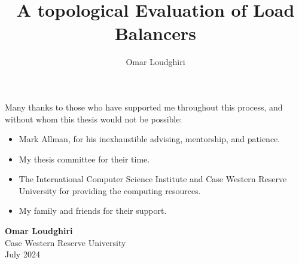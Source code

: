 \documentclass[12pt]{cwru_thesis}
\begin{document}


\title{A topological Evaluation of Load Balancers} %
\author{Omar Loudghiri} %



\maketitle


\begin{KeepFromToc}
  \tableofcontents
\end{KeepFromToc}
\listoftables
\listoffigures



\begin{acknowledgements}

\noindent Many thanks to those who have supported me throughout this process, and without whom this thesis would not be possible:

\begin{itemize}
    \item Mark Allman, for his inexhaustible advising, mentorship, and patience.
    \item My thesis committee for their time.
    \item The International Computer Science Institute and Case Western Reserve University for providing the computing resources. 
    \item My family and friends for their support.
\end{itemize}

\vspace{2cm}

\begin{flushright}
\textbf{Omar Loudghiri} \\
Case Western Reserve University \\
July 2024
\end{flushright}
\end{acknowledgements}
\end{document}
